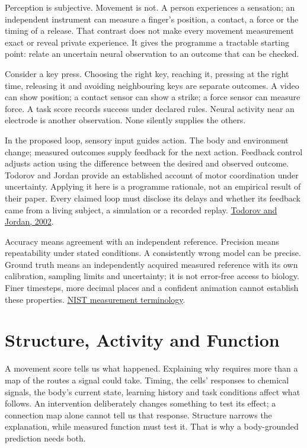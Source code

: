 Perception is subjective. Movement is not. A person experiences a sensation; an independent instrument can measure a finger's position, a contact, a force or the timing of a release. That contrast does not make every movement measurement exact or reveal private experience. It gives the programme a tractable starting point: relate an uncertain neural observation to an outcome that can be checked.\par

Consider a key press. Choosing the right key, reaching it, pressing at the right time, releasing it and avoiding neighbouring keys are separate outcomes. A video can show position; a contact sensor can show a strike; a force sensor can measure force. A task score records success under declared rules. Neural activity near an electrode is another observation. None silently supplies the others.\par

In the proposed loop, sensory input guides action. The body and environment
change; measured outcomes supply feedback for the next action. Feedback control
adjusts action using the difference between the desired and observed outcome.
Todorov and Jordan provide an established account of motor coordination under
uncertainty. Applying it here is a programme rationale, not an empirical result
of their paper. Every claimed loop must disclose its delays and whether its
feedback came from a living subject, a simulation or a recorded replay.
\href{https://www.nature.com/articles/nn963}{Todorov and Jordan, 2002}.\par

Accuracy means agreement with an independent reference. Precision means repeatability under stated conditions. A consistently wrong model can be precise. Ground truth means an independently acquired measured reference with its own calibration, sampling limits and uncertainty; it is not error-free access to biology. Finer timesteps, more decimal places and a confident animation cannot establish these properties. \href{https://www.nist.gov/pml/nist-technical-note-1297/nist-tn-1297-appendix-d1-terminology}{NIST measurement terminology}.\par

\section{Structure, Activity and Function}

A movement score tells us what happened. Explaining why requires more than a map of the routes a signal could take. Timing, the cells' responses to chemical signals, the body's current state, learning history and task conditions affect what follows. An intervention deliberately changes something to test its effect; a connection map alone cannot tell us that response. Structure narrows the explanation, while measured function must test it. That is why a body-grounded prediction needs both.\par

